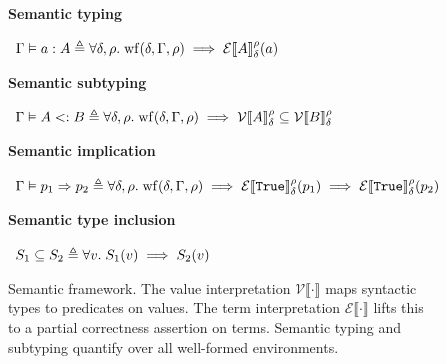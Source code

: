 \begin{figure}[p]
\vspace{0.7em}
\noindent\textbf{Semantic typing} \hfill {}

\vspace{0.5em}
\begin{math}
\begin{array}{r@{\;}c@{\;}l}
  \Gamma \vDash a : A &\triangleq& \forall \delta, \rho.\; \mathrm{wf}(\delta, \Gamma, \rho) \implies \mathcal{E}\llbracket A \rrbracket_{\delta}^{\rho}(a)
\end{array}
\end{math}

\vspace{0.7em}
\noindent\textbf{Semantic subtyping} \hfill {}

\vspace{0.5em}
\begin{math}
\begin{array}{r@{\;}c@{\;}l}
  \Gamma \vDash A <: B &\triangleq& \forall \delta, \rho.\; \mathrm{wf}(\delta, \Gamma, \rho) \implies \mathcal{V}\llbracket A \rrbracket_{\delta}^{\rho} \subseteq \mathcal{V}\llbracket B \rrbracket_{\delta}^{\rho}
\end{array}
\end{math}

\vspace{0.7em}
\noindent\textbf{Semantic implication} \hfill {}

\vspace{0.5em}
\begin{math}
\begin{array}{r@{\;}c@{\;}l}
  \Gamma \vDash p_1 \Rightarrow p_2 &\triangleq& \forall \delta, \rho.\; \mathrm{wf}(\delta, \Gamma, \rho) \implies \mathcal{E}\llbracket \texttt{True} \rrbracket_{\delta}^{\rho}(p_1) \implies \mathcal{E}\llbracket \texttt{True} \rrbracket_{\delta}^{\rho}(p_2)
\end{array}
\end{math}

\vspace{0.7em}
\noindent\textbf{Semantic type inclusion} \hfill {}

\vspace{0.5em}
\begin{math}
\begin{array}{r@{\;}c@{\;}l}
  S_1 \subseteq S_2 &\triangleq& \forall v.\; S_1(v) \implies S_2(v)
\end{array}
\end{math}

\vspace{0.5em}
\caption{Semantic framework. The value interpretation $\mathcal{V}\llbracket \cdot \rrbracket$ maps syntactic types to predicates on values. The term interpretation $\mathcal{E}\llbracket \cdot \rrbracket$ lifts this to a partial correctness assertion on terms. Semantic typing and subtyping quantify over all well-formed environments.}\label{fig:interp}
\end{figure}
